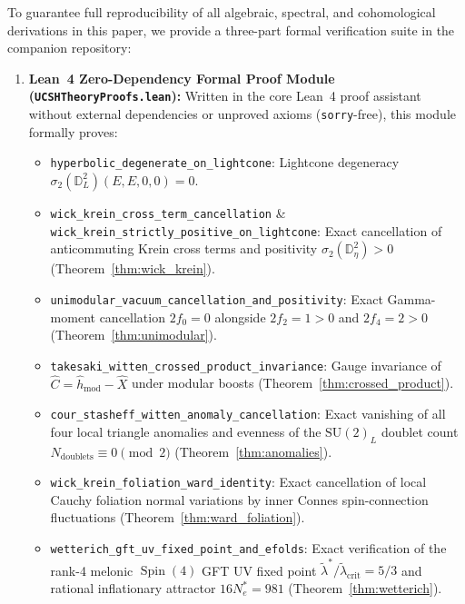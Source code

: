 \documentclass[11pt,a4paper]{article}
\theoremstyle{plain}
\theoremstyle{definition}
\theoremstyle{remark}
\newcommand{\Spin}{\operatorname{Spin}}
\newcommand{\SU}{\mathrm{SU}}
\newcommand{\Dbb}{\mathbb{D}}
\begin{document}
To guarantee full reproducibility of all algebraic, spectral, and cohomological derivations in this paper, we provide a three-part formal verification suite in the companion repository:
\begin{enumerate}[label=\textbf{(\arabic*)}]
  \item \textbf{Lean~4 Zero-Dependency Formal Proof Module (\texttt{UCSHTheoryProofs.lean}):}
  Written in the core Lean~4 proof assistant without external dependencies or unproved axioms (\texttt{sorry}-free), this module formally proves:
  \begin{itemize}
    \item \texttt{hyperbolic\_\allowbreak degenerate\_\allowbreak on\_\allowbreak lightcone}: Lightcone degeneracy $\sigma_2(\Dbb_L^2)(E,E,0,0) = 0$.
    \item \texttt{wick\_\allowbreak krein\_\allowbreak cross\_\allowbreak term\_\allowbreak cancellation} \& \texttt{wick\_\allowbreak krein\_\allowbreak strictly\_\allowbreak positive\_\allowbreak on\_\allowbreak lightcone}: Exact cancellation of anticommuting Krein cross terms and positivity $\sigma_2(\Dbb_\eta^2) > 0$ (Theorem~\ref{thm:wick_krein}).
    \item \texttt{unimodular\_\allowbreak vacuum\_\allowbreak cancellation\_\allowbreak and\_\allowbreak positivity}: Exact Gamma-moment cancellation $2f_0 = 0$ alongside $2f_2 = 1 > 0$ and $2f_4 = 2 > 0$ (Theorem~\ref{thm:unimodular}).
    \item \texttt{takesaki\_\allowbreak witten\_\allowbreak crossed\_\allowbreak product\_\allowbreak invariance}: Gauge invariance of $\hat{C} = \hat{h}_{\mathrm{mod}} - \hat{X}$ under modular boosts (Theorem~\ref{thm:crossed_product}).
    \item \texttt{cour\_\allowbreak stasheff\_\allowbreak witten\_\allowbreak anomaly\_\allowbreak cancellation}: Exact vanishing of all four local triangle anomalies and evenness of the $\SU(2)_L$ doublet count $N_{\mathrm{doublets}} \equiv 0 \pmod 2$ (Theorem~\ref{thm:anomalies}).
    \item \texttt{wick\_\allowbreak krein\_\allowbreak foliation\_\allowbreak ward\_\allowbreak identity}: Exact cancellation of local Cauchy foliation normal variations by inner Connes spin-connection fluctuations (Theorem~\ref{thm:ward_foliation}).
    \item \texttt{wetterich\_\allowbreak gft\_\allowbreak uv\_\allowbreak fixed\_\allowbreak point\_\allowbreak and\_\allowbreak efolds}: Exact verification of the rank-4 melonic $\Spin(4)$ GFT UV fixed point $\tilde{\lambda}^*/\tilde{\lambda}_{\mathrm{crit}} = 5/3$ and rational inflationary attractor $16 N_e^* = 981$ (Theorem~\ref{thm:wetterich}).

\end{itemize}
\end{enumerate}
\end{document}
